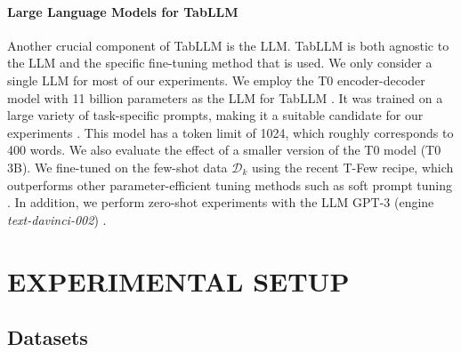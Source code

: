 \paragraph{Large Language Models for TabLLM} Another crucial component of TabLLM is the LLM. TabLLM is both agnostic to the LLM and the specific fine-tuning method that is used. We only consider a single LLM for most of our experiments. We employ the T0 encoder-decoder model with 11 billion parameters as the LLM for TabLLM \citep{sanh_multitask_2021}. It was trained on a large variety of task-specific prompts, making it a suitable candidate for our experiments \citep{sanh_multitask_2021}. This model has a token limit of 1024, which roughly corresponds to 400 words. We also evaluate the effect of a smaller version of the T0 model (T0 3B). We fine-tuned on the few-shot data $\mathcal{D}_k$ using the recent T-Few recipe, which outperforms other parameter-efficient tuning methods such as soft prompt tuning \citep{liu_few-shot_2022}. In addition, we perform zero-shot experiments with the LLM GPT-3 (engine \textit{text-davinci-002})  \citep{ouyang_training_2022}.

\section{EXPERIMENTAL SETUP}

\subsection{Datasets}

